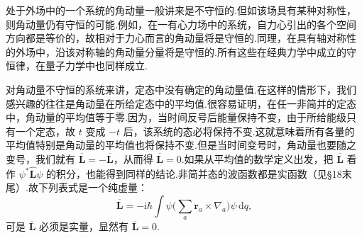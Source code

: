 处于外场中的一个系统的角动量一般讲来是不守恒的.但如该场具有某种对称性，则角动量仍有守恒的可能.例如，在一有心力场中的系统，自力心引出的各个空间方向都是等价的，故相对于力心而言的角动量将是守恒的.同理，在具有轴对称性的外场中，沿该对称轴的角动量分量将是守恒的.所有这些在经典力学中成立的守恒律，在量子力学中也同样成立.

对角动量不守恒的系统来讲，定态中没有确定的角动量值.在这样的情形下，我们感兴趣的往往是角动量在所给定态中的平均值.很容易证明，在任一非简并的定态中，角动量的平均值等于零.因为，当时间反号后能量保持不变，由于所给能级只有一个定态，故 $t$ 变成 $-t$ 后，该系统的态必将保持不变.这就意味着所有各量的平均值特别是角动量的平均值也将保持不变.但是当时间变号时，角动量也要随之变号，我们就有 $\overline{\boldsymbol{L}}=-\overline{\boldsymbol{L}}$，从而得 $\overline{\boldsymbol{L}}=0$.如果从平均值的数学定义出发，把 $\overline{\boldsymbol{L}}$ 看作 $\psi^{*}\hat{\boldsymbol{L}}\psi$ 的积分，也能得到同样的结论.非简并态的波函数都是实函数（见§18末尾）.故下列表式是一个纯虚量：
\begin{equation*}
  \overline{\boldsymbol{L}}
  =-\mathrm{i}\hbar\int\psi\biggl(\sum_a\boldsymbol{r}_a\times\nabla_a\biggr)\psi\,\mathrm{d}q,
\end{equation*}
可是 $\overline{\boldsymbol{L}}$ 必须是实量，显然有 $\overline{\boldsymbol{L}}=0$.

